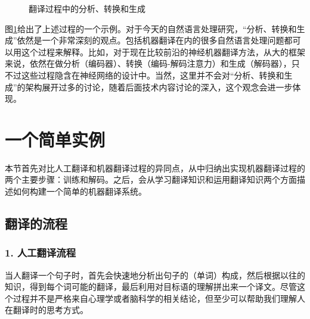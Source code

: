 \begin{figure}[htp]
 \centering

    \caption{翻译过程中的分析、转换和生成}
    \label{fig:5-2}
\end{figure}

\parinterval 图\ref{fig:5-2}给出了上述过程的一个示例。对于今天的自然语言处理研究，“分析、转换和生成”依然是一个非常深刻的观点。包括机器翻译在内的很多自然语言处理问题都可以用这个过程来解释。比如，对于现在比较前沿的神经机器翻译方法，从大的框架来说，依然在做分析（编码器）、转换（编码-解码注意力）和生成（解码器），只不过这些过程隐含在神经网络的设计中。当然，这里并不会对“分析、转换和生成”的架构展开过多的讨论，随着后面技术内容讨论的深入，这个观念会进一步体现。

\sectionnewpage
\section{一个简单实例}
\label{sec:simple-mt-example}

\parinterval 本节首先对比人工翻译和机器翻译过程的异同点，从中归纳出实现机器翻译过程的两个主要步骤：训练和解码。之后，会从学习翻译知识和运用翻译知识两个方面描述如何构建一个简单的机器翻译系统。


\subsection{翻译的流程}


\subsubsection*{1. 人工翻译流程}

\parinterval 当人翻译一个句子时，首先会快速地分析出句子的（单词）构成，然后根据以往的知识，得到每个词可能的翻译，最后利用对目标语的理解拼出来一个译文。尽管这个过程并不是严格来自心理学或者脑科学的相关结论，但至少可以帮助我们理解人在翻译时的思考方式。

